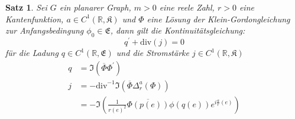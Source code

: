 \documentclass[11pt,a4paper,leqno]{report}
\newtheorem{proposition}{Satz}[chapter]
\numberwithin{equation}{chapter}
\begin{document}
\begin{proposition}
	Sei $G$ ein planarer Graph, $m>0$ eine reele Zahl, $r>0$ eine Kantenfunktion, $a\in C^1(\mathbb{R}, \mathfrak{K})$ und $\Phi$ eine L\"osung der Klein-Gordongleichung zur Anfangsbedingung $\phi_0\in\mathfrak{E}$, dann gilt die Kontinuit\"atsgleichung:
	\begin{equation}
		q^\prime + \text{div}(j) = 0 
	\end{equation}
	f\"ur die Ladung $q\in C^1(\mathbb{R},\mathfrak{E})$ und die Stromst\"arke $j\in C^1(\mathbb{R},\mathfrak{K})$
	\begin{align}
		q &= \Im(\overline{\Phi}\Phi^\prime)\\
		j &= -\text{div}^{-1}\Im(\overline{\Phi}\Delta^a_r(\Phi))\\
		  &= -\Im(\frac{1}{r(e)^2} \overline{\Phi(p(e))}\phi(q(e))e^{i\frac{a}{r}(e)})\nonumber
	\end{align}
\end{proposition}
\end{document}
